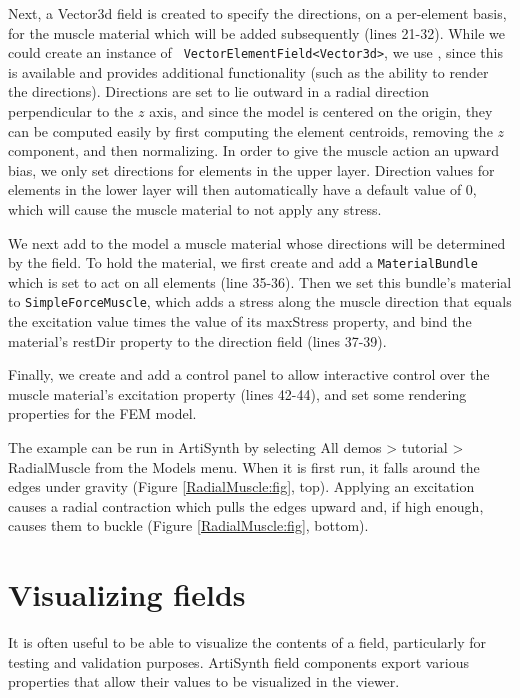 Next, a Vector3d field is created to specify the directions, on a
per-element basis, for the muscle material which will be added subsequently
(lines 21-32). While we could create an instance of {\tt
VectorElementField<Vector3d>}, we use
, since this
is available and provides additional functionality (such as the
ability to render the directions). Directions are set to lie outward
in a radial direction perpendicular to the $z$ axis, and since the
model is centered on the origin, they can be computed easily by first
computing the element centroids, removing the $z$ component, and then
normalizing. In order to give the muscle action an upward bias, we
only set directions for elements in the upper layer. Direction values
for elements in the lower layer will then automatically have a default
value of 0, which will cause the muscle material to not apply any
stress.

We next add to the model a muscle material whose directions will be
determined by the field. To hold the material, we first create and add
a {\tt MaterialBundle} which is set to act on all elements (line
35-36). Then we set this bundle's material to {\tt SimpleForceMuscle},
which adds a stress along the muscle direction that equals the
excitation value times the value of its {\sf maxStress} property, and
bind the material's {\sf restDir} property to the direction field
(lines 37-39).

Finally, we create and add a control panel to allow interactive
control over the muscle material's excitation property (lines 42-44),
and set some rendering properties for the FEM model.


The example can be run in ArtiSynth by selecting {\sf All demos >
tutorial > RadialMuscle} from the {\sf Models} menu.  When it is first
run, it falls around the edges under gravity (Figure
\ref{RadialMuscle:fig}, top). Applying an excitation causes a radial
contraction which pulls the edges upward and, if high enough, causes
them to buckle (Figure \ref{RadialMuscle:fig}, bottom).


\section{Visualizing fields}

It is often useful to be able to visualize the contents of a field,
particularly for testing and validation purposes. ArtiSynth field
components export various properties that allow their values to be
visualized in the viewer.

